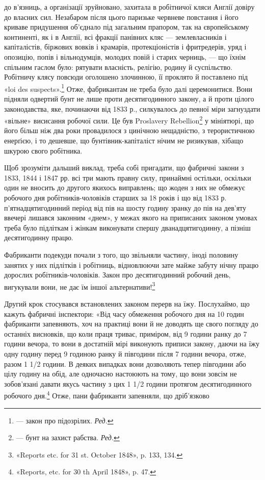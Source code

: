 \parcont{}  %
до в’язниць, а організації зруйновано, захитала в робітничої
кляси Англії довіру до власних сил. Незабаром після цього паризьке
червневе повстання і його криваве придушення об’єднало
під загальним прапором, так на європейському континенті, як
і в Англії, всі фракції панівних кляс — землевласників і капіталістів,
біржових вовків і крамарів, протекціоністів і фритредерів,
уряд і опозицію, попів і вільнодумців, молодих повій і
старих черниць, — що їхнім спільним гаслом було: рятувати власність,
релігію, родину й суспільство. Робітничу клясу повсюди
оголошено злочинною, її проклято й поставлено під «loi des
suspects».\footnote*{
— закон про підозрілих. \emph{Ред.}
} Отже, фабрикантам не треба було далі церемонитися.
Вони підняли одвертий бунт не лише проти десятигодинного закону,
а й проти цілого законодавства, яке, починаючи від 1833 р., силкувалось
до певної міри загнуздати «вільне» висисання робочої
сили. Це був Proslavery Rebellion\footnote*{
— бунт на захист рабства. \emph{Ред.}
} у мініятюрі, що його більш
ніж два роки провадилося з цинічною нещадністю, з терористичною
енерґією, і то дешевше, що бунтівник-капіталіст нічим
не ризикував, хібащо шкурою свого робітника.

Щоб зрозуміти дальший виклад, треба собі пригадати, що
фабричні закони з 1833, 1844 і 1847 рр. всі три мають правну
силу, принаймні остільки, оскільки один не вносить до другого
якихось виправлень; що жоден з них не обмежує робочого дня
робітників-чоловіків старших за 18 років і що від 1833 р. п’ятнадцятигодинний
період від пів на шосту годину зранку до пів
на дев’яту ввечері лишався законним «днем», у межах якого
на приписаних законом умовах треба було підліткам і жінкам
виконувати спершу дванадцятигодинну, а пізніш десятигодинну
працю.

Фабриканти подекуди почали з того, що звільняли частину,
іноді половину занятих у них підлітків і робітниць, відновлюючи
зате майже забуту нічну працю дорослих робітників-чоловіків.
Закон про десятигодинний робочий день, вигукували вони, не
дає їм іншої альтернативи!\footnote{
«Reports etc. for 31 st. October 1848», p. 133, 134.
}

Другий крок стосувався встановлених законом перерв на їжу.
Послухаймо, що кажуть фабричні інспектори: «Від часу обмеження
робочого дня на 10 годин фабриканти запевняють, хоч на практиці
вони й не доводять ще свого погляду до останніх висновків,
що коли праця триває, приміром, від 9 години ранку до 7 години
вечора, то вони в достатній мірі виконують приписи закону, даючи
на їжу одну годину перед 9 годиною ранку й півгодини після
7 години вечора, отже, разом 1 1/2 години. В деяких випадках
вони дозволяють тепер півгодини або цілу годину на обід, але одночасно
настоюють на тому, що вони зовсім не зобов’язані давати
якусь частину з цих 1 1/2 години протягом десятигодинного робочого
дня.\footnote{
«Reports, etc. for 30 th April 1848», p. 47.
} Отже, пани фабриканти запевняли, що дріб’язково
\parbreak{}  %
